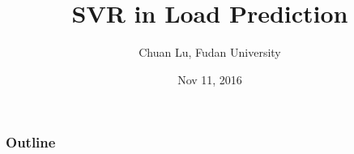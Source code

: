 




\title[SVR in Load Prediction]{SVR in Load Prediction} %

\author{Chuan Lu, Fudan University} %
\institute[Fudan]
{} %
\date{Nov 11, 2016} %



\begin{frame}
\titlepage %
\end{frame}

\begin{frame}
\frametitle{Outline} %
\tableofcontents %
\end{frame}

